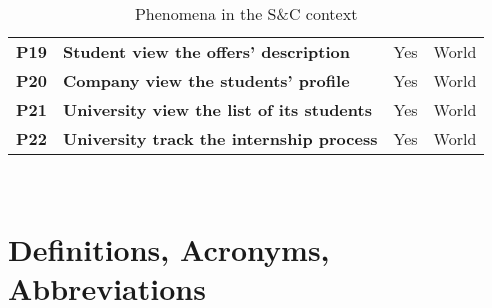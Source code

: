 \begin{table}[H]
\begin{tabular}{|c|p{20em}|c|c|}
    \textbf{P19} & \textbf{Student view the offers' description} & Yes & World \T\B \\
    \textbf{P20} & \textbf{Company view the students' profile} & Yes & World \T\B\\
    \textbf{P21} & \textbf{University view the list of its students} & Yes & World \B\\
    \textbf{P22} & \textbf{University track the internship process} & Yes & World \T\B\\
    \hline
    \end{tabular}
    \\[10pt]
    \caption{Phenomena in the S\&C context}
    \label{table:phenomena}
\end{table}

\section{Definitions, Acronyms, Abbreviations}
\label{sec:definitions}
